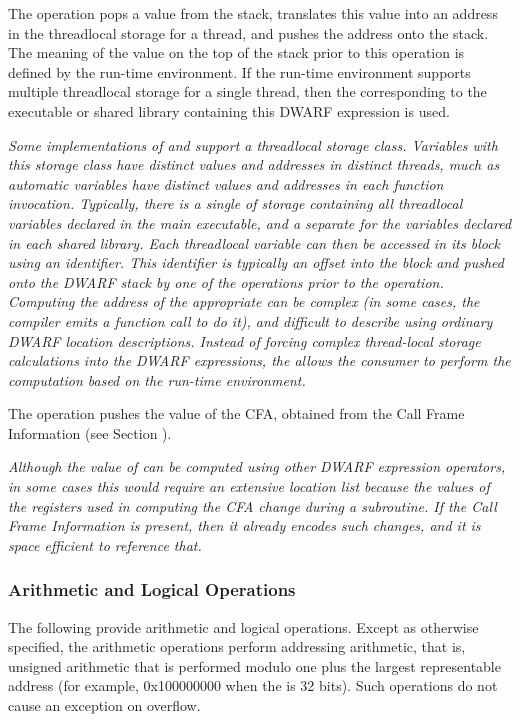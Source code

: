 \begin{enumerate}[1. ]
\itembfnl{\DWOPformtlsaddressTARG}
The \DWOPformtlsaddressTARG{} 
operation pops a value from the stack, translates this
value into an address in the 
thread\dash local storage for a thread, and pushes the address 
onto the stack. 
The meaning of the value on the top of the stack prior to this 
operation is defined by the run-time environment.  If the run-time 
environment supports multiple thread\dash local storage 
 for a single thread, then the  
corresponding to the executable or shared 
library containing this DWARF expression is used.
   
\textit{Some implementations of 
 and  support a
thread\dash local storage class. Variables with this storage class
have distinct values and addresses in distinct threads, much
as automatic variables have distinct values and addresses in
each function invocation. Typically, there is a single 
of storage containing all thread\dash local variables declared in
the main executable, and a separate  for the variables
declared in each shared library. 
Each thread\dash local variable can then be accessed in its block using an
identifier. This identifier is typically an offset into the block and pushed
onto the DWARF stack by one of the 
\DWOPconstnx{} operations prior to the
\DWOPformtlsaddress{} operation. 
Computing the address of
the appropriate  can be complex (in some cases, the
compiler emits a function call to do it), and difficult
to describe using ordinary DWARF location descriptions.
Instead of    forcing complex thread-local storage calculations into 
the DWARF expressions, the \DWOPformtlsaddress{} allows the consumer 
to perform the computation based on the run-time environment.}

\itembfnl{\DWOPcallframecfaTARG}
The \DWOPcallframecfaTARG{} 
operation pushes the value of the
CFA, obtained from the Call Frame Information 
(see Section ).

\textit{Although the value of \DWATframebase{}
can be computed using other DWARF expression operators,
in some cases this would require an extensive location list
because the values of the registers used in computing the
CFA change during a subroutine. If the 
Call Frame Information 
is present, then it already encodes such changes, and it is
space efficient to reference that.}
\end{enumerate}

\subsubsection{Arithmetic and Logical Operations}
The 
following 
provide arithmetic and logical operations. Except
as otherwise specified, the arithmetic operations perform
addressing arithmetic, that is, unsigned arithmetic that is
performed modulo one plus the largest representable address
(for example, 0x100000000 when the 
 is 32 bits). 
Such operations do not cause an exception on overflow.

